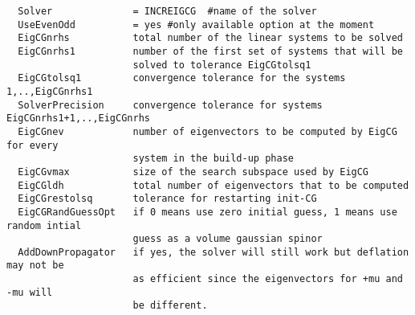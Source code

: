 \documentclass[a4paper,10pt]{article}
\begin{document}
\begin{verbatim}
  Solver              = INCREIGCG  #name of the solver
  UseEvenOdd          = yes #only available option at the moment
  EigCGnrhs           total number of the linear systems to be solved
  EigCGnrhs1          number of the first set of systems that will be 
                      solved to tolerance EigCGtolsq1
  EigCGtolsq1         convergence tolerance for the systems 1,..,EigCGnrhs1
  SolverPrecision     convergence tolerance for systems EigCGnrhs1+1,..,EigCGnrhs
  EigCGnev            number of eigenvectors to be computed by EigCG for every 
                      system in the build-up phase
  EigCGvmax           size of the search subspace used by EigCG 
  EigCGldh            total number of eigenvectors that to be computed
  EigCGrestolsq       tolerance for restarting init-CG 
  EigCGRandGuessOpt   if 0 means use zero initial guess, 1 means use random intial 
                      guess as a volume gaussian spinor
  AddDownPropagator   if yes, the solver will still work but deflation may not be 
                      as efficient since the eigenvectors for +mu and -mu will 
                      be different.
\end{verbatim}
\end{document}
